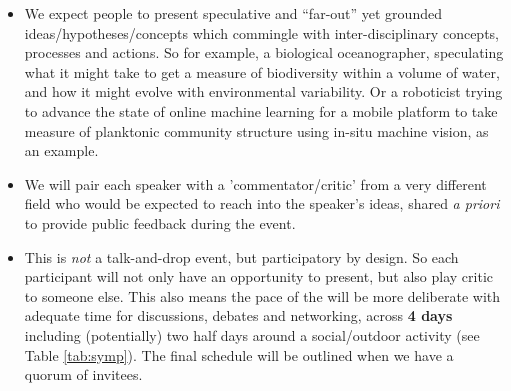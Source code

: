 \begin{itemize}

\item We expect people to present speculative and ``far-out'' yet
  grounded ideas/hypotheses/concepts which commingle with
  inter-disciplinary concepts, processes and actions. So for example,
  a biological oceanographer, speculating what it might take to get a
  measure of biodiversity within a volume of water, and how it might
  evolve with environmental variability. Or a roboticist trying to
  advance the state of online machine learning for a mobile platform
  to take measure of planktonic community structure using in-situ
  machine vision, as an example. 

\item We will pair each speaker with a 'commentator/critic' from a
  very different field who would be expected to reach into the
  speaker's ideas, shared \emph{a priori} to provide public feedback
  during the event. 

\item This is \emph{not} a talk-and-drop event, but participatory by
  design. So each participant will not only have an opportunity to
  present, but also play critic to someone else. This also means the
  pace of the \symp will be more deliberate with adequate time for
  discussions, debates and networking, across \textbf{4 days}
  including (potentially) two half days around a social/outdoor
  activity (see Table \ref{tab:symp}). The final schedule will be
  outlined when we have a quorum of invitees.





\end{itemize}  

